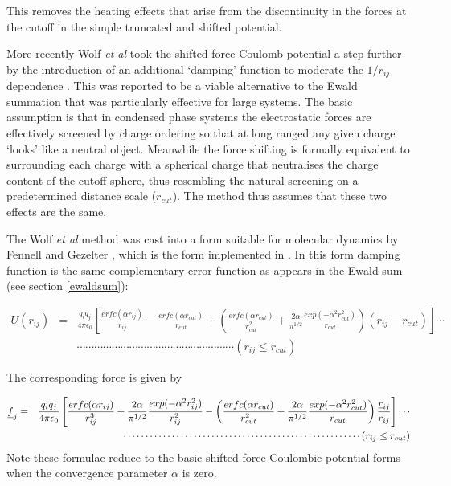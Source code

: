 This removes the heating effects that arise from the discontinuity
in the forces at the cutoff in the simple truncated and shifted
potential. 

More recently Wolf {\em et al} \cite{wolf-99a} took the shifted force
Coulomb potential a step further by the introduction of an additional
`damping' function to moderate the $1/r_{ij}$ dependence
. This was
reported to be a viable alternative to the Ewald summation that was
particularly effective for large systems.  The basic assumption is
that in condensed phase systems the electrostatic forces are
effectively screened by charge ordering so that at long ranged any
given charge `looks' like a neutral object. Meanwhile the force
shifting is formally equivalent to surrounding each charge with a
spherical charge that neutralises the charge content of the cutoff
sphere, thus resembling the natural screening on a predetermined
distance scale ($r_{cut}$). The method thus assumes that these two
effects are the same.

The Wolf {\em et al} method \cite{wolf-99a} was cast into a form
suitable for molecular dynamics by Fennell and Gezelter  \cite{fennell-06a}, which is
the form implemented in \D{}. In this form damping function is the same
complementary error function as appears in the Ewald sum (see section
\ref{ewaldsum}):

\begin{eqnarray}
U(r_{ij})&=&\frac{q_{i}q_{j}}{4\pi\epsilon_{0}}
\left [\frac{erfc(\alpha r_{ij})}{r_{ij}}-\frac{erfc(\alpha 
 r_{cut})}{r_{cut}}+
 \left(\frac{erfc(\alpha
 r_{cut})}{r_{cut}^{2}}+\frac{2\alpha}{\pi^{1/2}}
\frac{exp(-\alpha^{2}r_{cut}^{2})}{r_{cut}}\right )(r_{ij}-r_{cut})
\right ] \cdots \nonumber \\
 & & \cdots \cdots \cdots \cdots \cdots \cdots \cdots \cdots \cdots 
\cdots \cdots \cdots \cdots \cdots \cdots \cdots \cdots \cdots 
(r_{ij}\le r_{cut})
\end{eqnarray}

The corresponding force is given by

\begin{eqnarray}
\mbox{$\underline{f}$}_{j}&=&\frac{q_{i}q_{j}}{4\pi\epsilon_{0}}
\left[\frac{erfc(\alpha r_{ij})}{r_{ij}^{3}}+\frac{2\alpha}{\pi^{1/2}}\frac{exp(-\alpha^{2} r_{ij}^{2})}{r_{ij}^{2}}-
 \left(\frac{erfc(\alpha r_{cut})}{r_{cut}^{2}}+\frac{2\alpha}{\pi^{1/2}}
\frac{exp(-\alpha^{2}r_{cut}^{2})}{r_{cut}}\right )\frac{\mbox{$\underline{r}$}_{ij}}{r_{ij}}
\right] \cdots \nonumber \\
 & & \cdots \cdots \cdots \cdots \cdots \cdots \cdots \cdots \cdots 
\cdots \cdots \cdots \cdots \cdots \cdots \cdots \cdots \cdots 
(r_{ij}\le r_{cut})
\end{eqnarray}
Note these formulae reduce to the basic shifted force Coulombic
potential forms when the convergence parameter $\alpha$ is zero.

